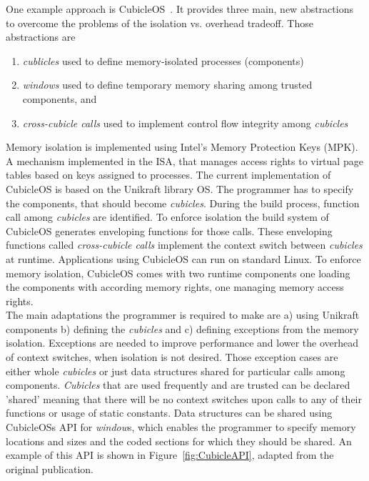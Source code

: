 One example approach is CubicleOS~\cite{sartakov2021cubicleos}. It provides three main, new abstractions to overcome the problems of the isolation vs. overhead tradeoff. Those abstractions are 
\begin{enumerate}
    \item \emph{cublicles} used to define memory-isolated processes (components)
    \item \emph{windows} used to define temporary memory sharing among trusted components, and
    \item \emph{cross-cubicle calls} used to implement control flow integrity among \emph{cubicles}
\end{enumerate}
Memory isolation is implemented using Intel's Memory Protection Keys (MPK)\cite{intel64and}. A mechanism implemented in the ISA, that manages access rights to virtual page tables based on keys assigned to processes. The current implementation of CubicleOS is based on the Unikraft library OS\cite{kuenzer2021unikraft}. The programmer has to specify the components, that should become \emph{cubicles}. During the build process, function call among \emph{cubicles} are identified. To enforce isolation the build system of CubicleOS generates enveloping functions for those calls. These enveloping functions 
called \emph{cross-cubicle calls} implement the context switch between \emph{cubicles} at runtime. Applications using CubicleOS can run on standard Linux. To enforce memory isolation, CubicleOS comes with two runtime components one loading the components with according memory rights, one managing memory access rights. \\
The main adaptations the programmer is required to make are a) using Unikraft components b) defining the \emph{cubicles} and c) defining exceptions from the memory isolation. Exceptions are needed to improve performance and lower the overhead of context switches, when isolation is not desired. Those exception cases are either whole \emph{cubicles} or just data structures shared for particular calls among components. \emph{Cubicles} that are used frequently and are trusted can be declared 'shared' meaning  that there will be no context switches upon calls to any of their functions or usage of static constants. Data structures can be shared using CubicleOSs API for \emph{window}s, which enables the programmer to specify memory locations and sizes and the coded sections for which they should be shared. An example of this API is shown in Figure~\ref{fig:CubicleAPI}, adapted from the original publication.

